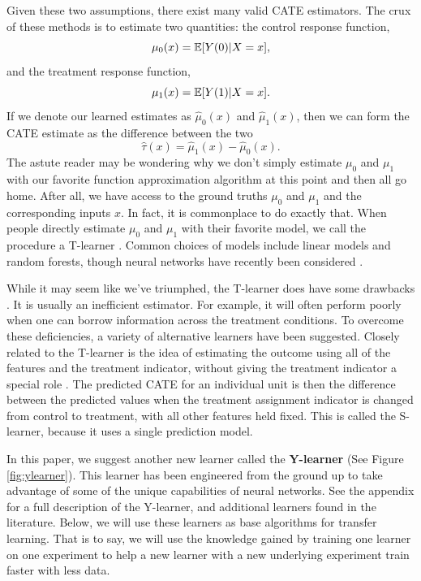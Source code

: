 Given these two assumptions, there exist many valid CATE estimators. The crux of these methods is to estimate two quantities: 
the control response function, 
$$
\mu_0(x) = \mathbb{E}[Y(0)|X=x],
$$
and the treatment response function,
$$
\mu_1(x) = \mathbb{E}[Y(1)|X=x].
$$
If we denote our learned estimates as $\hat\mu_0(x)$ and $\hat\mu_1(x)$, then we can form the CATE estimate as the difference between the two
$$
\hat \tau(x) = \hat \mu_1(x) - \hat \mu_0(x).
$$
The astute reader may be wondering why we don't simply estimate $\mu_0$ and $\mu_1$ with our favorite function approximation algorithm at this point and then all go home. After all, we have access to the ground truths $\mu_0$ and $\mu_1$ and the corresponding inputs $x$. In fact, it is commonplace to do exactly that. When people directly estimate $\mu_0$ and $\mu_1$ with their favorite model, we call the procedure a T-learner \citep{kunzel2017meta}. Common choices of models include linear models and random forests, though neural networks have recently been considered \citep{nie2017learning}. 

While it may seem like we've triumphed, the T-learner does have some drawbacks \citep{athey2015machine}. It is usually an inefficient estimator. For example, it will often perform poorly when one can borrow information across the treatment conditions. To overcome these deficiencies, a variety of alternative learners have been suggested. Closely related to the T-learner is the idea of estimating the outcome using all of the features and the treatment indicator, without giving the treatment indicator a
special role \citep{hill2011bayesian}. The predicted CATE for an individual unit is then the difference between the predicted values when the treatment assignment indicator is changed from control to treatment, with all other features held fixed. This is called the S-learner, because it uses a single prediction model.

In this paper, we suggest another new learner called the $\mathbf{Y}$\textbf{-learner} (See Figure \ref{fig:ylearner}). This learner has been engineered from the ground up to take advantage of some of the unique capabilities of neural networks. See the appendix for a full description of the Y-learner, and additional learners found in the literature. Below, we will use these learners as base algorithms for transfer learning. That is to say, we will use the knowledge gained by training one learner on one experiment to help a new learner with a new underlying experiment train faster with less data. 

